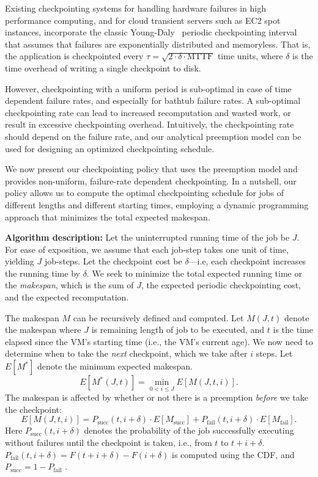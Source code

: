 \documentclass[sigconf]{acmart} %
\begin{document}
Existing checkpointing systems for handling hardware failures in high performance computing, and for cloud transient servers such as EC2 spot instances, incorporate the classic Young-Daly~\cite{dongarra_fault_nodate, daly2006higher, flint, marathe2014exploiting} periodic checkpointing interval that assumes that failures are exponentially distributed and memoryless.  
That is, the application is checkpointed every $\tau = \sqrt{2 \cdot \delta \cdot \text{MTTF}}$ time units, where $\delta$ is the time overhead of writing a single checkpoint to disk. 


However, checkpointing with a uniform period is sub-optimal in case of time dependent failure rates, and especially for bathtub failure rates. 
A sub-optimal checkpointing rate can lead to increased recomputation and wasted work, or result in excessive checkpointing overhead. 
Intuitively, the checkpointing rate should depend on the failure rate, and our analytical preemption model can be used for designing an optimized checkpointing schedule.

We now present our checkpointing policy that uses the preemption model and provides non-uniform, failure-rate dependent checkpointing.
In a nutshell, our policy allows us to compute the optimal checkpointing schedule for jobs of different lengths and different starting times, employing a dynamic programming approach that minimizes the total expected makespan. 

\noindent \textbf{Algorithm description:}
Let the uninterrupted running time of the job be $J$.
For ease of exposition, we assume that each job-step takes one unit of time, yielding $J$ job-steps. 
Let the checkpoint cost be $\delta$---i.e, each checkpoint increases the running time by $\delta$. 
We seek to minimize the total expected running time or the \emph{makespan}, which is the sum of $J$, the expected periodic checkpointing cost, and the expected recomputation. 

The makespan $M$ can be recursively defined and computed.
Let $M(J, t)$ denote the makespan where $J$ is remaining length of job to be executed, and $t$ is the time elapsed since the  VM's starting time (i.e., the VM's current age). 
We now need to determine when to take the \emph{next} checkpoint, which we take after $i$ steps. Let $E[M^*]$ denote the minimum expected makespan.
\begin{equation}
  \label{eq:m0}
  E[M^*(J, t)] = \min_{0<i\leq J}{E[M(J, t, i)]}.
\end{equation}
The makespan is affected by whether or not there is a preemption \emph{before} we take the checkpoint: 
\begin{equation}
  \label{eq:m1}
E[M(J, t, i)] = P_{\text{succ}}(t, i+\delta) \cdot E[M_{\text{succ}}] + P_{\text{fail}}(t, i+\delta) \cdot E[M_{\text{fail}}].
\end{equation}
Here $P_{\text{succ}}(t, i+\delta)$ denotes the probability of the job successfully executing without failures until the checkpoint is taken, i.e., from $t$ to $t+i+\delta$. $P_{\text{fail}}(t, i+\delta) = F(t+i+\delta)-F(i+\delta)$ is computed using the CDF, 
and $P_{\text{succ}} = 1 - P_{\text{fail}}$ .
\end{document}
